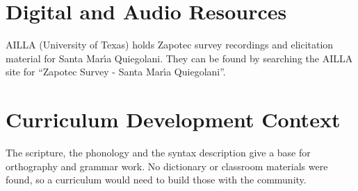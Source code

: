 \documentclass[12pt]{article}
\begin{document}
\section{Digital and Audio Resources}
AILLA (University of Texas) holds Zapotec survey recordings and elicitation material for Santa Mar\'{\i}a Quiegolani. They can be found by searching the AILLA site for ``Zapotec Survey - Santa Mar\'{\i}a Quiegolani''.

\section{Curriculum Development Context}
The scripture, the phonology and the syntax description give a base for orthography and grammar work. No dictionary or classroom materials were found, so a curriculum would need to build those with the community.
\end{document}
